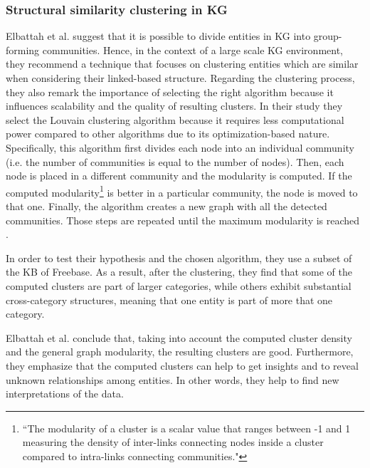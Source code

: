 \documentclass[runningheads]{llncs}
\begin{document}
\subsubsection{Structural similarity clustering in KG} \label{structural-similarity}
Elbattah et al. \cite{Elbattah} suggest that it is possible to divide entities in KG into group-forming communities. Hence, in the context of a large scale KG environment, they recommend a technique that focuses on clustering entities which are similar when considering their linked-based structure. Regarding the clustering process, they also remark the importance of selecting the right algorithm because it influences scalability and the quality of resulting clusters. In their study they select the Louvain clustering algorithm because it requires less computational power compared to other algorithms due to its optimization-based nature. Specifically, this algorithm first divides each node into an individual community (i.e. the number of communities is equal to the number of nodes). Then, each node is placed in a different community and the modularity is computed. If the computed modularity\footnote{``The modularity of a cluster is a scalar value that ranges between -1 and 1 measuring the density of inter-links connecting nodes inside a cluster compared to intra-links connecting communities."\cite{Elbattah}} is better in a particular community, the node is moved to that one. Finally, the algorithm creates a new graph with all the detected communities. Those steps are repeated until the maximum modularity is reached \cite{Elbattah}.

In order to test their hypothesis and the chosen algorithm, they use a subset of the KB of Freebase. As a result, after the clustering, they find that some of the computed clusters are part of larger categories, while others exhibit substantial cross-category structures, meaning that one entity is part of more that one category. 

Elbattah et al. \cite{Elbattah} conclude that, taking into account the computed cluster density and the general graph modularity, the resulting clusters are good. Furthermore, they emphasize that the computed clusters can help to get insights and to reveal unknown relationships among entities. In other words, they help to find new interpretations of the data.
\end{document}
